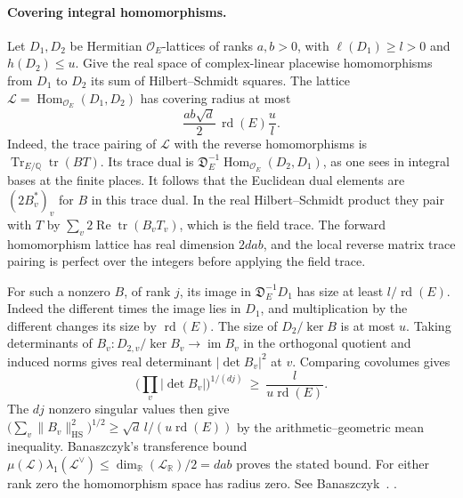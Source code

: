\paragraph{Covering integral homomorphisms.}
Let \(D_1,D_2\) be Hermitian \(\mathcal O_E\)-lattices
of ranks \(a,b>0\), with \(\ell(D_1)\ge l>0\) and
\(h(D_2)\le u\). Give the real space of complex-linear
placewise homomorphisms from \(D_1\) to \(D_2\) its sum of
Hilbert--Schmidt squares. The lattice
\(\mathcal L=\operatorname{Hom}_{\mathcal O_E}(D_1,D_2)\)
has covering radius at most
\[
 \frac{ab\sqrt d}{2}\,\operatorname{rd}(E)\frac{u}{l}.
\]
Indeed, the trace pairing of \(\mathcal L\) with the reverse
homomorphisms is \(\operatorname{Tr}_{E/\mathbb Q}\operatorname{tr}(BT)\).
Its trace dual is
\(\mathfrak D_E^{-1}\operatorname{Hom}_{\mathcal O_E}(D_2,D_1)\),
as one sees in integral bases at the finite places. It follows
that the Euclidean dual elements are \((2B_v^*)_v\) for \(B\)
in this trace dual. In the real Hilbert--Schmidt product they pair
with \(T\) by \(\sum_v2\operatorname{Re}\operatorname{tr}(B_v T_v)\),
which is the field trace. The forward homomorphism lattice has real
dimension \(2dab\), and the local reverse matrix trace pairing is
perfect over the integers before applying the field trace.

For such a nonzero \(B\), of rank \(j\), its image in
\(\mathfrak D_E^{-1}D_1\) has size at least
\(l/\operatorname{rd}(E)\). Indeed the different times the
image lies in \(D_1\), and multiplication by the different
changes its size by \(\operatorname{rd}(E)\).
The size of \(D_2/\ker B\) is at most \(u\). Taking
determinants of \(B_v:D_{2,v}/\ker B_v\to\operatorname{im}B_v\)
in the orthogonal quotient and induced norms gives real determinant
\(|\det B_v|^2\) at \(v\). Comparing covolumes gives
\[
 \Big(\prod_v|\det B_v|\Big)^{1/(dj)}
 \ \ge\ \frac{l}{u\operatorname{rd}(E)}.
\]
The \(dj\) nonzero singular values then give
\(\big(\sum_v\|B_v\|_{\mathrm{HS}}^2\big)^{1/2}
\ge\sqrt d\,l/(u\operatorname{rd}(E))\) by the
arithmetic--geometric mean inequality. Banaszczyk's
transference bound \(\mu(\mathcal L)\lambda_1(\mathcal L^\vee)
\le\dim_{\mathbb R}(\mathcal L_{\mathbb R})/2=dab\)
proves the stated bound. For either rank zero the
homomorphism space has radius zero.
See Banaszczyk~\cite[Theorem~(2.2)]{depth-banaszczyk}.
.

